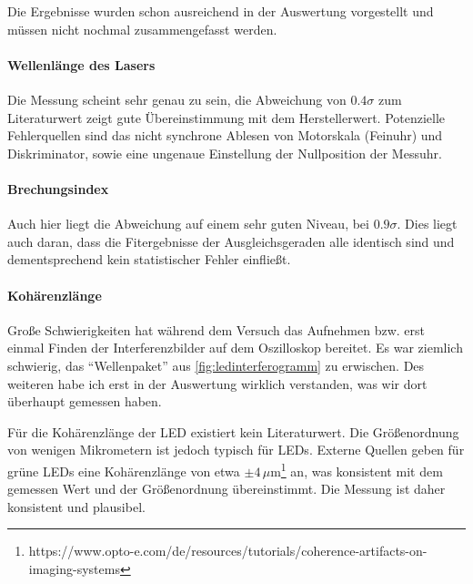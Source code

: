 Die Ergebnisse wurden schon ausreichend in der Auswertung vorgestellt und müssen nicht nochmal zusammengefasst werden. 
\paragraph{Wellenlänge des Lasers}
Die Messung scheint sehr genau zu sein, die Abweichung von \(0.4\sigma\) zum Literaturwert zeigt gute Übereinstimmung mit dem Herstellerwert. Potenzielle Fehlerquellen sind das nicht synchrone Ablesen von Motorskala (Feinuhr) und Diskriminator, sowie eine ungenaue Einstellung der Nullposition der Messuhr. 

\paragraph{Brechungsindex}
Auch hier liegt die Abweichung auf einem sehr guten Niveau, bei \(0.9\sigma\). Dies liegt auch daran, dass die Fitergebnisse der Ausgleichsgeraden alle identisch sind und dementsprechend kein statistischer Fehler einfließt. 

\paragraph{Kohärenzlänge}
Große Schwierigkeiten hat während dem Versuch das Aufnehmen bzw. erst einmal Finden der Interferenzbilder auf dem Oszilloskop bereitet. Es war ziemlich schwierig, das \enquote{Wellenpaket} aus \cref{fig:ledinterferogramm} zu erwischen. Des weiteren habe ich erst in der Auswertung wirklich verstanden, was wir dort überhaupt gemessen haben. 

Für die Kohärenzlänge der LED existiert kein Literaturwert. Die Größenordnung von wenigen Mikrometern ist jedoch typisch für LEDs. Externe Quellen geben für grüne LEDs eine Kohärenzlänge von etwa \(\pm 4\,\mu\mathrm{m}\)\footnote{https://www.opto-e.com/de/resources/tutorials/coherence-artifacts-on-imaging-systems} an, was konsistent mit dem gemessen Wert und der Größenordnung übereinstimmt. Die Messung ist daher konsistent und plausibel.
